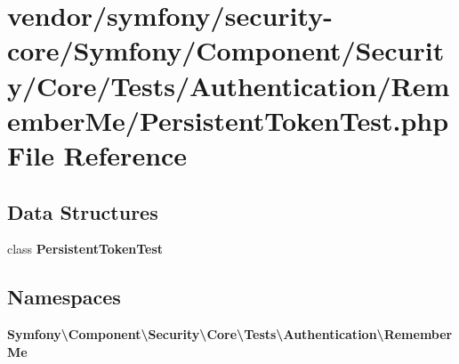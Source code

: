 \section{vendor/symfony/security-\/core/\+Symfony/\+Component/\+Security/\+Core/\+Tests/\+Authentication/\+Remember\+Me/\+Persistent\+Token\+Test.php File Reference}
\label{_persistent_token_test_8php}
\subsection*{Data Structures}
\begin{DoxyCompactItemize}
\item 
class {\bf Persistent\+Token\+Test}
\end{DoxyCompactItemize}
\subsection*{Namespaces}
\begin{DoxyCompactItemize}
\item 
 {\bf Symfony\textbackslash{}\+Component\textbackslash{}\+Security\textbackslash{}\+Core\textbackslash{}\+Tests\textbackslash{}\+Authentication\textbackslash{}\+Remember\+Me}
\end{DoxyCompactItemize}
